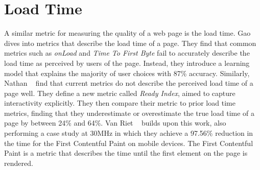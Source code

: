 \section{Load Time}\label{sec:related-work:load-time}
A similar metric for measuring the quality of a web page is the load time. Gao \etal{}~\cite{gao2017perceived} dives into metrics that describe the load time of a page. They find that common metrics such as \emph{onLoad} and \emph{Time To First Byte} fail to accurately describe the load time as perceived by users of the page. Instead, they introduce a learning model that explains the majority of user choices with 87\% accuracy.
Similarly, Nathan \etal{}~\cite{nathan2018measuring} find that current metrics do not describe the perceived load time of a page well. They define a new metric called \emph{Ready Index}, aimed to capture interactivity explicitly. They then compare their metric to prior load time metrics, finding that they underestimate or overestimate the true load time of a page by between 24\% and 64\%.
Van Riet \etal{}~\cite{van20206} builds upon this work, also performing a case study at 30MHz in which they achieve a 97.56\% reduction in the time for the First Contentful Paint on mobile devices. The First Contentful Paint is a metric that describes the time until the first element on the page is rendered.
